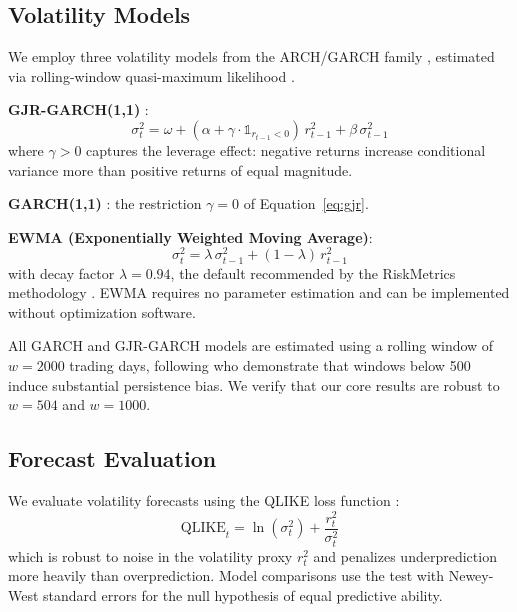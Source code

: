 \subsection{Volatility Models}

We employ three volatility models from the ARCH/GARCH family \citep{engle1982,bollerslev1986}, estimated via rolling-window quasi-maximum likelihood \citep{bollerslev1992}.

\textbf{GJR-GARCH(1,1)} \citep{glosten1993}:
\begin{equation}
\sigma_t^2 = \omega + (\alpha + \gamma \cdot \mathbb{1}_{r_{t-1}<0}) \, r_{t-1}^2 + \beta \, \sigma_{t-1}^2
\label{eq:gjr}
\end{equation}
where $\gamma > 0$ captures the leverage effect: negative returns increase conditional variance more than positive returns of equal magnitude.

\textbf{GARCH(1,1)} \citep{bollerslev1986}: the restriction $\gamma = 0$ of Equation~\eqref{eq:gjr}.

\textbf{EWMA (Exponentially Weighted Moving Average)}:
\begin{equation}
\sigma_t^2 = \lambda \, \sigma_{t-1}^2 + (1 - \lambda) \, r_{t-1}^2
\label{eq:ewma}
\end{equation}
with decay factor $\lambda = 0.94$, the default recommended by the RiskMetrics methodology \citep{jpmorgan1996}. EWMA requires no parameter estimation and can be implemented without optimization software.

All GARCH and GJR-GARCH models are estimated using a rolling window of $w = 2000$ trading days, following \citet{hwang2006} who demonstrate that windows below 500 induce substantial persistence bias. We verify that our core results are robust to $w = 504$ and $w = 1000$.

\subsection{Forecast Evaluation}

We evaluate volatility forecasts using the QLIKE loss function \citep{patton2011}:
\begin{equation}
\text{QLIKE}_t = \ln(\sigma_t^2) + \frac{r_t^2}{\sigma_t^2}
\label{eq:qlike}
\end{equation}
which is robust to noise in the volatility proxy $r_t^2$ and penalizes underprediction more heavily than overprediction. Model comparisons use the \citet{diebold1995} test with Newey-West standard errors for the null hypothesis of equal predictive ability.

